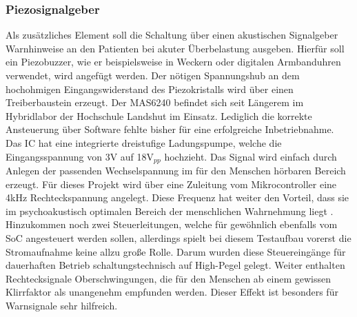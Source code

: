 \documentclass[12pt]{scrreprt} %
\begin{document}
\subsubsection{Piezosignalgeber}
Als zusätzliches Element soll die Schaltung über einen akustischen Signalgeber Warnhinweise an den Patienten bei akuter Überbelastung ausgeben. Hierfür soll ein Piezobuzzer, wie er beispielsweise in Weckern oder digitalen Armbanduhren verwendet, wird angefügt werden. Der nötigen Spannungshub an dem hochohmigen Eingangswiderstand des Piezokristalls wird über einen Treiberbaustein erzeugt. Der MAS6240 befindet sich seit Längerem im Hybridlabor der Hochschule Landshut im Einsatz. Lediglich die korrekte Ansteuerung über Software fehlte bisher für eine erfolgreiche Inbetriebnahme. Das IC hat eine integrierte dreistufige Ladungspumpe, welche die Eingangsspannung von 3V auf 18$\text{V}_{pp}$ hochzieht. Das Signal wird einfach durch Anlegen der passenden Wechselspannung im für den Menschen hörbaren Bereich erzeugt. Für dieses Projekt wird über eine Zuleitung vom Mikrocontroller eine 4kHz Rechteckspannung angelegt. Diese Frequenz hat weiter den Vorteil, dass sie im psychoakustisch optimalen Bereich der menschlichen Wahrnehmung liegt \citep{Psych}. Hinzukommen noch zwei Steuerleitungen, welche für gewöhnlich ebenfalls vom SoC angesteuert werden sollen, allerdings spielt bei diesem Testaufbau vorerst die Stromaufnahme keine allzu große Rolle. Darum wurden diese Steuereingänge für dauerhaften Betrieb schaltungstechnisch auf High-Pegel gelegt. Weiter enthalten Rechtecksignale Oberschwingungen, die für den Menschen ab einem gewissen Klirrfaktor als unangenehm empfunden werden. Dieser Effekt ist besonders für Warnsignale sehr hilfreich.
\end{document}
